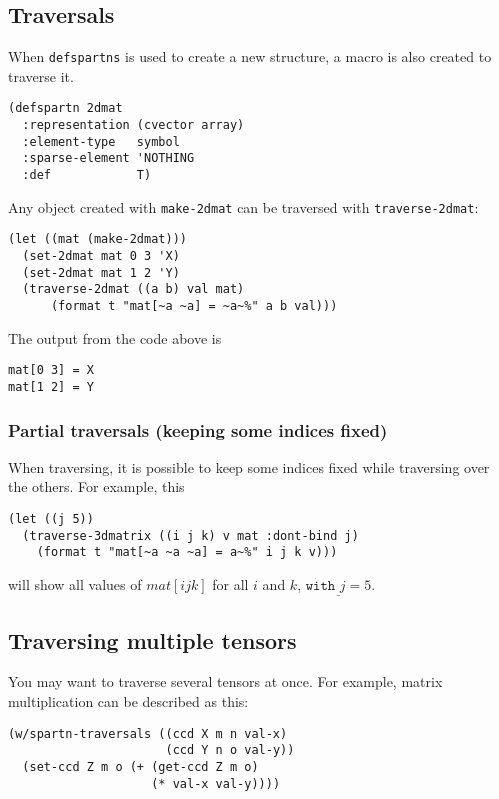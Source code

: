\documentclass{article}
\begin{document}
\subsection{Traversals}

When \verb+defspartns+ is used to create a new structure, a macro is also created to traverse it.

\begin{lstlisting}
(defspartn 2dmat
  :representation (cvector array)
  :element-type   symbol
  :sparse-element 'NOTHING
  :def            T)
\end{lstlisting}

Any object created with \verb+make-2dmat+ can be traversed with \verb+traverse-2dmat+:

\begin{lstlisting}
(let ((mat (make-2dmat)))
  (set-2dmat mat 0 3 'X)
  (set-2dmat mat 1 2 'Y)
  (traverse-2dmat ((a b) val mat)
      (format t "mat[~a ~a] = ~a~%" a b val)))
\end{lstlisting}

The output from the code above is

\begin{lstlisting}
mat[0 3] = X
mat[1 2] = Y
\end{lstlisting}

\subsubsection{Partial traversals (keeping some indices fixed)}

When traversing, it is possible to keep some indices fixed while
traversing over the others. For example, this

\begin{lstlisting}
(let ((j 5))
  (traverse-3dmatrix ((i j k) v mat :dont-bind j)
    (format t "mat[~a ~a ~a] = a~%" i j k v)))
\end{lstlisting}

will show all values of $mat[i j k]$ for all $i$ and $k$, $\underline{ \texttt{with } j=5}$.

\subsection{Traversing multiple tensors}

You may want to traverse several tensors at once. For example, matrix multiplication
can be described as this:

\begin{lstlisting}
(w/spartn-traversals ((ccd X m n val-x)
                      (ccd Y n o val-y))
  (set-ccd Z m o (+ (get-ccd Z m o)
                    (* val-x val-y))))
\end{lstlisting}
\end{document}
